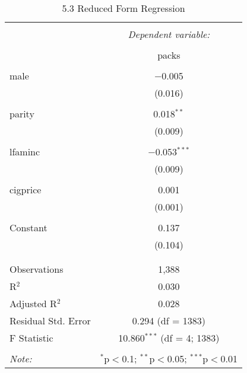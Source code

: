 \documentclass[11pt]{article} %
\begin{document}
\begin{table}[!htbp] \centering 
	\caption{5.3 Reduced Form Regression} 
	\label{5.3::partd} 
  \begin{tabular}{@{\extracolsep{5pt}}lc} 
  \\[-1.8ex]\hline 
  \hline \\[-1.8ex] 
   & \multicolumn{1}{c}{\textit{Dependent variable:}} \\ 
  \cline{2-2} 
  \\[-1.8ex] & packs \\ 
  \hline \\[-1.8ex] 
   male & $-$0.005 \\ 
	& (0.016) \\ 
	& \\ 
   parity & 0.018$^{**}$ \\ 
	& (0.009) \\ 
	& \\ 
   lfaminc & $-$0.053$^{***}$ \\ 
	& (0.009) \\ 
	& \\ 
   cigprice & 0.001 \\ 
	& (0.001) \\ 
	& \\ 
   Constant & 0.137 \\ 
	& (0.104) \\ 
	& \\ 
  \hline \\[-1.8ex] 
  Observations & 1,388 \\ 
  R$^{2}$ & 0.030 \\ 
  Adjusted R$^{2}$ & 0.028 \\ 
  Residual Std. Error & 0.294 (df = 1383) \\ 
  F Statistic & 10.860$^{***}$ (df = 4; 1383) \\ 
  \hline 
  \hline \\[-1.8ex] 
  \textit{Note:}  & \multicolumn{1}{r}{$^{*}$p$<$0.1; $^{**}$p$<$0.05; $^{***}$p$<$0.01} \\ 
  \end{tabular} 
  \end{table} 
\end{document}
